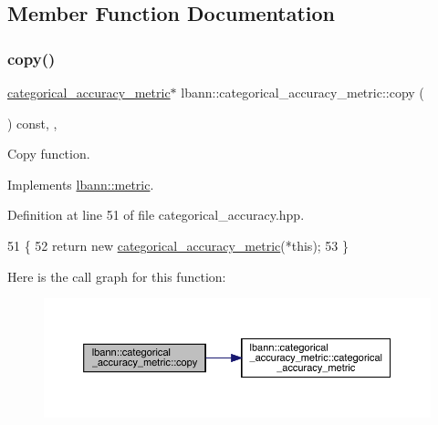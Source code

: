 \subsection{Member Function Documentation}
\mbox{\label{classlbann_1_1categorical__accuracy__metric_a46ce5b6eb09fecc8b0029fb62ba8cf66}} 
\subsubsection{\texorpdfstring{copy()}{copy()}}
{\footnotesize\ttfamily \hyperlink{classlbann_1_1categorical__accuracy__metric}{categorical\+\_\+accuracy\+\_\+metric}$\ast$ lbann\+::categorical\+\_\+accuracy\+\_\+metric\+::copy (\begin{DoxyParamCaption}{ }\end{DoxyParamCaption}) const\hspace{0.3cm}{\ttfamily [inline]}, {\ttfamily [override]}, {\ttfamily [virtual]}}

Copy function. 

Implements \hyperlink{classlbann_1_1metric_a2a4498d41f77da8585552f485caab167}{lbann\+::metric}.



Definition at line 51 of file categorical\+\_\+accuracy.\+hpp.


\begin{DoxyCode}
51                                                      \{
52     \textcolor{keywordflow}{return} \textcolor{keyword}{new} \hyperlink{classlbann_1_1categorical__accuracy__metric_ae7ea6f472bd6375780c49277742af9dc}{categorical\_accuracy\_metric}(*\textcolor{keyword}{this});
53   \}
\end{DoxyCode}
Here is the call graph for this function\+:\nopagebreak
\begin{figure}[H]
\begin{center}
\leavevmode
\includegraphics[width=350pt]{classlbann_1_1categorical__accuracy__metric_a46ce5b6eb09fecc8b0029fb62ba8cf66_cgraph}
\end{center}
\end{figure}
\mbox{\label{classlbann_1_1categorical__accuracy__metric_a0ec8c3254569c9f9855675243ac51612}} 
